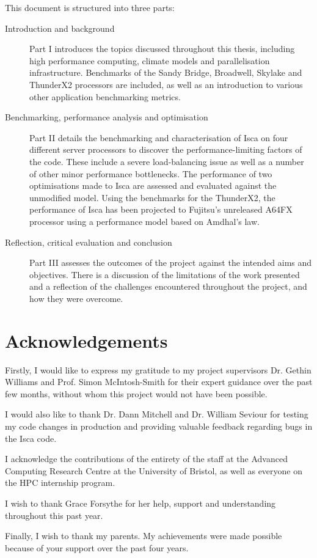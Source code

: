 \documentclass[a4paper,11pt]{report}
\begin{document}
\par
This document is structured into three parts:
\begin{description}

	\item[Introduction and background] Part I introduces the topics discussed throughout this thesis, including high performance computing, climate models and parallelisation infrastructure. Benchmarks of the Sandy Bridge, Broadwell, Skylake and ThunderX2 processors are included, as well as an introduction to various other application benchmarking metrics. 
	
	\item[Benchmarking, performance analysis and optimisation] Part II details the benchmarking and characterisation of Isca on four different server processors to discover the performance-limiting factors of the code. These include a severe load-balancing issue as well as a number of other minor performance bottlenecks. The performance of two optimisations made to Isca are assessed and evaluated against the unmodified model. Using the benchmarks for the ThunderX2, the performance of Isca has been projected to Fujitsu's unreleased A64FX processor using a performance model based on Amdhal's law. 
	
	\item[Reflection, critical evaluation and conclusion] Part III assesses the outcomes of the project against the intended aims and objectives. There is a discussion of the limitations of the work presented and a reflection of the challenges encountered throughout the project, and how they were overcome.
\end{description}

  

\chapter*{Acknowledgements}
Firstly, I would like to express my gratitude to my project supervisors Dr. Gethin Williams and Prof. Simon McIntosh-Smith for their expert guidance over the past few months, without whom this project would not have been possible. 
\par
I would also like to thank Dr. Dann Mitchell and Dr. William Seviour for testing my code changes in production and providing valuable feedback regarding bugs in the Isca code. 
\par
I acknowledge the contributions of the entirety of the staff at the Advanced Computing Research Centre at the University of Bristol, as well as everyone on the HPC internship program. 
\par
I wish to thank Grace Forsythe for her help, support and understanding throughout this past year.
\par
Finally, I wish to thank my parents. My achievements were made possible because of your support over the past four years. 
\end{document}

